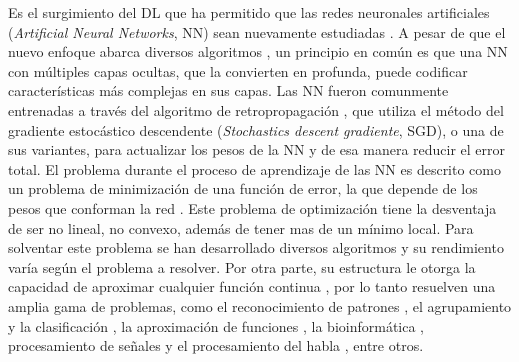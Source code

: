 

Es el surgimiento del DL que ha permitido que las redes neuronales artificiales ({\em Artificial Neural Networks}, NN) sean nuevamente estudiadas \cite{Bengio2006, Hinton2006, Le2012, Ranzato2007}. A pesar de que el nuevo enfoque abarca diversos algoritmos \cite{Bengio2007, Hinton2006}, un principio en común es que una NN con múltiples capas ocultas, que la convierten en profunda, puede codificar características más complejas en sus capas. Las NN fueron comunmente entrenadas a través del algoritmo de retropropagación \cite{Rumelhart1986b}, que utiliza el método del gradiente estocástico descendente ({\em Stochastics descent gradiente}, SGD), o una de sus variantes, para actualizar los pesos de la NN y de esa manera reducir el error total. El problema durante el proceso de aprendizaje de las NN es descrito como un problema de minimización de una función de error, la que depende de los pesos que conforman la red \cite{Rumelhart1986}. Este problema de optimización tiene la desventaja de ser no lineal, no convexo, además de tener mas de un mínimo local. Para solventar este problema se han desarrollado diversos algoritmos \cite{Grippo1994, Jacobs1988, Plagianakos2002, Rumelhart1986b, Plagianakos1998}  y su rendimiento varía según el problema a resolver. Por otra parte,  su estructura  le otorga la capacidad de aproximar cualquier función continua \cite{Hornik1991}, por lo tanto resuelven una amplia gama de problemas, como el reconocimiento de patrones \cite{Jain2000}, el agrupamiento y la clasificación \cite{Zhang2000}, la aproximación de funciones \cite{Selmic2002}, la bioinformática \cite{Mitra2006}, procesamiento de señales \cite{Hwang1997} y el procesamiento del habla \cite{Gorin1994}, entre otros.


